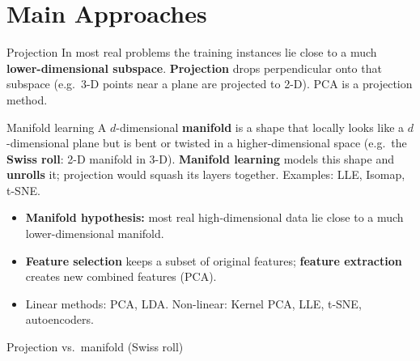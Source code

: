 \section{Main Approaches}
\begin{dfn}{Projection}
In most real problems the training instances lie close to a much \textbf{lower-dimensional subspace}. \textbf{Projection} drops perpendicular onto that subspace (e.g.\ 3-D points near a plane are projected to 2-D). PCA is a projection method.
\end{dfn}
\begin{dfn}{Manifold learning}
A $d$-dimensional \textbf{manifold} is a shape that locally looks like a $d$-dimensional plane but is bent or twisted in a higher-dimensional space (e.g.\ the \textbf{Swiss roll}: 2-D manifold in 3-D). \textbf{Manifold learning} models this shape and \textbf{unrolls} it; projection would squash its layers together. Examples: LLE, Isomap, t-SNE.
\end{dfn}
\begin{itemize}
  \item \textbf{Manifold hypothesis:} most real high-dimensional data lie close to a much lower-dimensional manifold.
  \item \textbf{Feature selection} keeps a subset of original features; \textbf{feature extraction} creates new combined features (PCA).
  \item Linear methods: PCA, LDA. Non-linear: Kernel PCA, LLE, t-SNE, autoencoders.
\end{itemize}
\begin{drawit}{Projection vs.\ manifold (Swiss roll)}
\centering
{}
\end{drawit}

